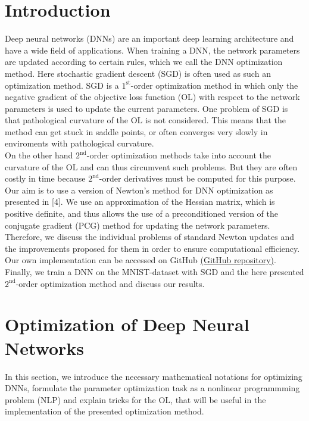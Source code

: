 \documentclass[conference]{IEEEtran}
\begin{document}
	\section{Introduction}
	\noindent
	Deep neural networks (DNNs) are an important deep learning architecture and have a wide field of applications. When training a DNN, the network parameters are updated according to certain rules, which we call the DNN optimization method. Here stochastic gradient descent (SGD) is often used as such an optimization method. SGD is a $1^{\text{st}}$-order optimization method in which only the negative gradient of the objective loss function (OL) with respect to the network parameters is used to update the current parameters. One problem of SGD is that pathological curvature of the OL is not considered. 
	This means that the method can get stuck in saddle points, or often converges very slowly in enviroments with pathological curvature.\\
	On the other hand $2^{\text{nd}}$-order optimization methods take into account the curvature of the OL and can thus circumvent such problems. 
	But 
	they are often costly in time because $2^{\text{nd}}$-order derivatives must be computed for this purpose.\\
	Our aim is to use a version of Newton's method for DNN optimization as presented in [4]. We use an approximation of the Hessian matrix, which is positive definite, and thus allows the use of a preconditioned version of the conjugate gradient (PCG) method for updating the network parameters. Therefore, we discuss the individual problems of standard Newton updates and the improvements proposed for them in order to ensure computational efficiency. Our own implementation can be accessed on GitHub \href{https://github.com/NiklasBrunn/Hessian_Free_Optimization_of_Deep_Neural_Networks}{(GitHub repository)}.\\
	Finally, we train a DNN on the MNIST-dataset with SGD and the here presented $2^{\text{nd}}$-order optimization method and discuss our results.


	\section{Optimization of Deep Neural Networks}
	\noindent
	In this section, we introduce the necessary mathematical notations for optimizing DNNs, formulate the parameter optimization task as a nonlinear programmming problem (NLP) and explain tricks for the OL, that will be useful in the implementation of the presented optimization method.
\end{document}
